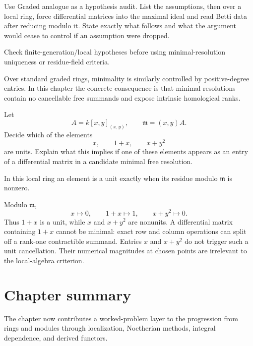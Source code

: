 \begin{exercise}\label{exr:v25-08}
Use Graded analogue as a hypothesis audit. List the assumptions, then over a local ring, force differential matrices into the maximal ideal and read Betti data after reducing modulo it. State exactly what follows and what the argument would cease to control if an assumption were dropped.
\end{exercise}
\begin{hint}
Check finite-generation/local hypotheses before using minimal-resolution uniqueness or residue-field criteria.
\end{hint}
\begin{solution}
Over standard graded rings, minimality is similarly controlled by positive-degree entries. In this chapter the concrete consequence is that minimal resolutions contain no cancellable free summands and expose intrinsic homological ranks.
\end{solution}

\begin{exercise}\label{exr:v25-exact-unit-01}
Let
\[
A=k[x,y]_{(x,y)},
\qquad
\mathfrak m=(x,y)A.
\]
Decide which of the elements
\[
x,\qquad 1+x,\qquad x+y^2
\]
are units.  Explain what this implies if one of these elements appears as an
entry of a differential matrix in a candidate minimal free resolution.
\end{exercise}
\begin{hint}
In this local ring an element is a unit exactly when its residue modulo
\(\mathfrak m\) is nonzero.
\end{hint}
\begin{solution}
Modulo \(\mathfrak m\),
\[
x\mapsto0,\qquad 1+x\mapsto1,\qquad x+y^2\mapsto0.
\]
Thus \(1+x\) is a unit, while \(x\) and \(x+y^2\) are nonunits.  A differential
matrix containing \(1+x\) cannot be minimal: exact row and column operations
can split off a rank-one contractible summand.  Entries \(x\) and \(x+y^2\)
do not trigger such a unit cancellation.  Their numerical magnitudes at
chosen points are irrelevant to the local-algebra criterion.
\end{solution}

\section*{Chapter summary}
The chapter now contributes a worked-problem layer to the progression from rings and modules through localization, Noetherian methods, integral dependence, and derived functors.
